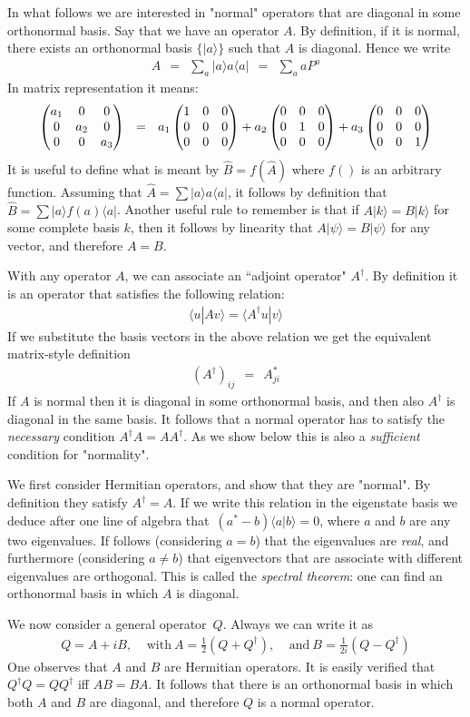 \documentclass[onecolumn,fleqn, 11pt]{revtex4}
\newcommand{\amatrix}[1]{\begin{matrix} #1 \end{matrix}}
\newcommand{\beq}{\begin{eqnarray}}
\newcommand{\eeq}{\end{eqnarray}}
\begin{document}
In what follows we are interested in "normal" 
operators that are diagonal in some orthonormal basis.  
Say that we have an operator ${A}$. 
By definition, if it is normal, there exists 
an orthonormal basis ${\{ |a\rangle \}}$ such that $A$ 
is diagonal. Hence we write 
\beq
A \ \ = \ \ \sum_{a}|a\rangle a\langle a| \ \ = \ \ \sum_{a}aP^{a} 
\eeq
In matrix representation it means:
\beq
\left( \amatrix{ a_1 & 0 & 0 \cr 0 & a_2 & 0 \cr 0 & 0 & a_3 } \right) 
\ \ = \ \ 
a_1 \left( \amatrix{ 1 & 0 & 0 \cr 0 & 0 & 0 \cr 0 & 0 & 0 } \right) 
+a_2 \left( \amatrix{ 0 & 0 & 0 \cr 0 & 1 & 0 \cr 0 & 0 & 0 } \right) 
+ a_3 \left( \amatrix{ 0 & 0 & 0 \cr 0 & 0 & 0 \cr 0 & 0 & 1} \right) 
\eeq
It is useful to define what is meant 
by ${\hat{B}=f(\hat{A})}$ where ${f()}$ is an 
arbitrary function. Assuming 
that ${\hat{A}=\sum |a\rangle a\langle a|}$, 
it follows by definition 
that ${\hat{B}=\sum |a\rangle f(a )\langle a|}$. 
Another useful rule to remember is that 
if ${A |k\rangle = B |k\rangle}$ for some 
complete basis ${k}$, then it follows by 
linearity that ${A |\psi\rangle = B |\psi\rangle}$ 
for any vector, and therefore ${A=B}$. 


With any operator $A$, we can associate an ``adjoint operator" $A^{\dagger}$. 
By definition it is an operator that satisfies the following relation: 
\beq
\langle u|A v \rangle = \langle A^{\dagger} u|v\rangle 
\eeq
If we substitute the basis vectors in the above 
relation we get the equivalent matrix-style definition 
\beq
(A^{\dagger})_{ij} \ \ = \ \ A_{ji}^{*}
\eeq
If $A$ is normal then it is diagonal in some 
orthonormal basis, and then also $A^{\dagger}$
is diagonal in the same basis.
It follows that a normal operator has 
to satisfy the {\em necessary} condition 
${A^{\dagger}A=AA^{\dagger}}$.
As we show below this is also a {\em sufficient} condition 
for "normality".  


We first consider Hermitian operators, 
and show that they are "normal". 
By definition they satisfy ${A^{\dagger}=A}$.
If we write this relation in the eigenstate basis 
we deduce after one line of algebra 
that~${(a^*-b)\langle a|b\rangle=0}$, 
where $a$ and $b$ are any two eigenvalues.
If follows (considering ${a=b}$) that the eigenvalues 
are {\em real}, and furthermore (considering ${a\ne b}$)
that eigenvectors that are associate 
with different eigenvalues are orthogonal.  
This is called the {\em spectral theorem}:
one can find an orthonormal basis in which $A$ is diagonal.

We now consider a general operator~$Q$.
Always we can write it as 
\beq
Q=A+iB, \ \ \ \ \  
\mbox{with} \ A=\frac{1}{2}(Q+Q^{\dagger}), \ \ \ \ \ 
\mbox{and} \ B=\frac{1}{2i}(Q-Q^{\dagger})
\eeq
One observes that $A$ and $B$ are Hermitian operators. 
It is easily verified that ${Q^{\dagger}Q=QQ^{\dagger}}$
iff $AB=BA$. It follows that there is 
an orthonormal basis in which both $A$ and $B$ are diagonal, 
and therefore $Q$ is a normal operator.
\end{document}

